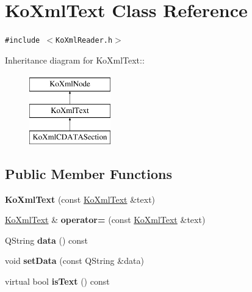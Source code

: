 \hypertarget{classKoXmlText}{
\section{KoXmlText Class Reference}
\label{classKoXmlText}
}
{\tt \#include $<$KoXmlReader.h$>$}

Inheritance diagram for KoXmlText::\begin{figure}[H]
\begin{center}
\leavevmode
\includegraphics[height=3cm]{classKoXmlText}
\end{center}
\end{figure}
\subsection*{Public Member Functions}
\begin{CompactItemize}
\item 
\hypertarget{classKoXmlText_527977cf8218598fc9744b55d8918dcb}{
\textbf{KoXmlText} (const \hyperlink{classKoXmlText}{KoXmlText} \&text)}
\label{classKoXmlText_527977cf8218598fc9744b55d8918dcb}

\item 
\hypertarget{classKoXmlText_bd7ee0d827d614bd5a387cdef944fc68}{
\hyperlink{classKoXmlText}{KoXmlText} \& \textbf{operator=} (const \hyperlink{classKoXmlText}{KoXmlText} \&text)}
\label{classKoXmlText_bd7ee0d827d614bd5a387cdef944fc68}

\item 
\hypertarget{classKoXmlText_b5ee4186e97c97fa2bbf54dc9ffc074f}{
QString \textbf{data} () const }
\label{classKoXmlText_b5ee4186e97c97fa2bbf54dc9ffc074f}

\item 
\hypertarget{classKoXmlText_2e3b8ce0b903e43caf233d2b93ebd733}{
void \textbf{setData} (const QString \&data)}
\label{classKoXmlText_2e3b8ce0b903e43caf233d2b93ebd733}

\item 
\hypertarget{classKoXmlText_910aeb556cd3a9bac84baf81899f3490}{
virtual bool \textbf{isText} () const }
\label{classKoXmlText_910aeb556cd3a9bac84baf81899f3490}

\end{CompactItemize}
